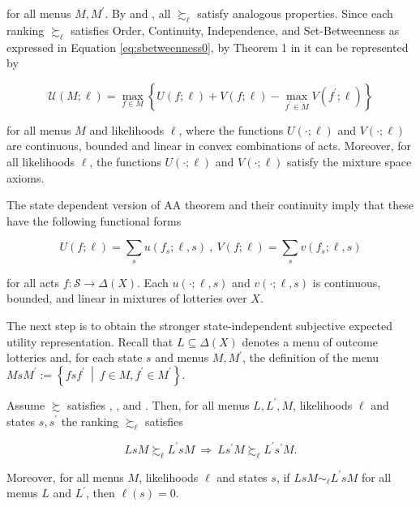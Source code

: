 for all menus \( M, M^{\prime} \). By  and , all \( \succsim_{\ell} \) satisfy analogous properties. Since each ranking \(\succsim_{\ell}\) satisfies Order, Continuity, Independence, and Set-Betweenness as expressed in Equation \eqref{eq:sbetweenness0}, by Theorem 1 in \cite{kopylovTemptationsGeneralSettings2009} it can be represented by

\begin{equation}\label{eq:tempt}
	\mathcal{U} \left(M ; \ell \right) = \max_{f \in M}\left\{ U  \left(f ; \ell \right) + V \left( f ; \ell \right) - \max _{f^{\prime} \in M} V\left(f^{\prime} ; \ell \right)  \right\}
\end{equation}

for all menus \( M \) and likelihoods \( \ell \), where the functions \( U \left( \cdot ; \ell \right) \) and \( V \left( \cdot ; \ell \right) \) are continuous, bounded and linear in convex combinations of acts. Moreover, for all likelihoods \( \ell \), the functions \( U \left( \cdot ; \ell \right) \) and \( V \left( \cdot ; \ell \right) \) satisfy the mixture space axioms.

The state dependent version of AA theorem and their continuity imply that these have the following functional forms

\begin{equation}\label{eq:act}
	U \left(f ; \ell \right) = \sum_{s} u \left(f_{s} ; \ell, s \right) \: , \: V \left( f ; \ell \right) = \sum_{s} v \left(f_{s} ; \ell, s \right)
\end{equation}

for all acts \( f : \mathcal{S} \rightarrow \Delta \left( X \right) \). Each \( u \left( \cdot ; \ell, s \right) \) and \( v \left( \cdot ; \ell, s \right) \) is continuous, bounded, and linear in mixtures of lotteries over \( X \).

The next step is to obtain the stronger state-independent subjective expected utility representation. Recall that \( L \subseteq \Delta \left( X \right) \) denotes a menu of outcome lotteries and, for each state \( s \) and menus \( M, M^{\prime} \), the definition of the menu \( M s M^{\prime} := \left\{ f s f^{\prime} \: \middle\vert  \: f \in M, f^{\prime} \in M^{\prime} \right\} \).

\begin{lemma}\label{lem:sindep}
	Assume \( \succsim \) satisfies , , and . Then, for all menus \( L, L^{\prime}, M \), likelihoods \( \ell \) and states \( s, s^{\prime} \) the ranking \( \succsim_{\ell} \) satisfies

	\begin{equation}\label{eq:lem2}
		LsM \succsim_{\ell} L^{\prime} s M \: \Rightarrow \: L {s^{\prime}} M \succsim_{\ell} L^{\prime} {s^{\prime}} M .
	\end{equation}

	Moreover, for all  menus \( M \), likelihoods \( \ell \) and states \( s \), if \( LsM \sim_{\ell} L^{\prime} s M \) for all menus \( L \) and \( L^{\prime} \), then \( \ell \left( s \right) = 0 \).
\end{lemma}

